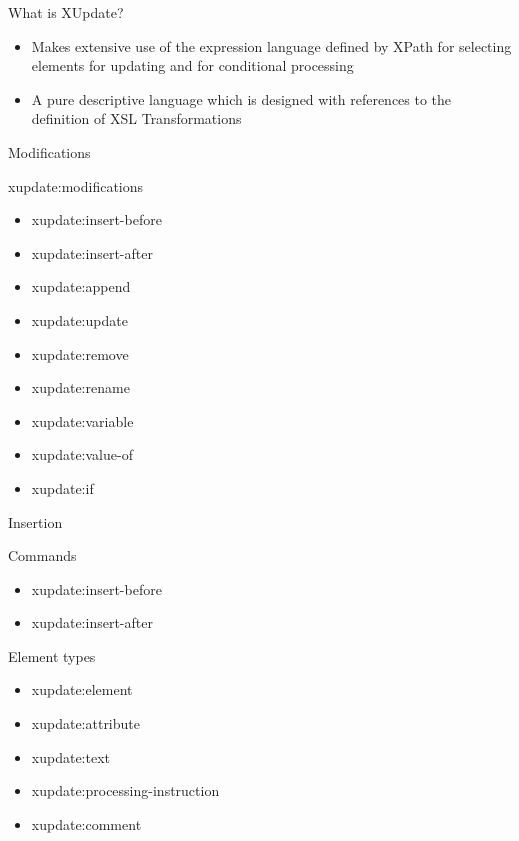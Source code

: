\documentclass[sans]{beamer}
\begin{document}

\begin{frame}{What is XUpdate?}
	\begin{itemize}
		\item Makes extensive use of the expression language defined by XPath for selecting elements for updating and for conditional processing
		\item A pure descriptive language which is designed with references to the definition of XSL Transformations
	\end{itemize}
\end{frame}

\begin{frame}{Modifications}
	\begin{block}{xupdate:modifications}
	\begin{itemize}
		\item xupdate:insert-before
		\item xupdate:insert-after
		\item xupdate:append
		\item xupdate:update
		\item xupdate:remove
		\item xupdate:rename
		\item xupdate:variable
		\item xupdate:value-of
		\item xupdate:if
	\end{itemize}
	\end{block}
\end{frame}

\begin{frame}{Insertion}
	\begin{block}{Commands}
	\begin{itemize}
		\item xupdate:insert-before
		\item xupdate:insert-after
	\end{itemize}
	\end{block}

	\begin{block}{Element types}
	\begin{itemize}
		\item xupdate:element
		\item xupdate:attribute
		\item xupdate:text
		\item xupdate:processing-instruction
		\item xupdate:comment
	\end{itemize}
	\end{block}
\end{frame}
\end{document}
